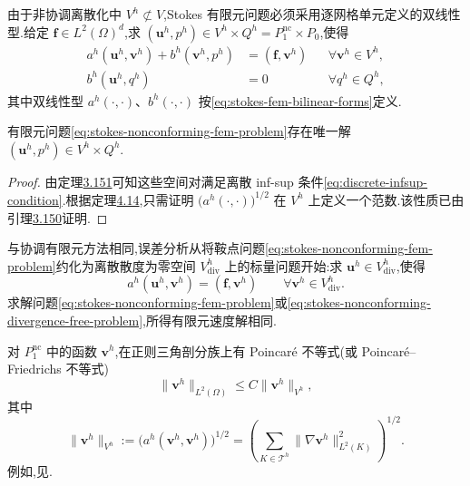 \begin{note}[有限元问题]\label{note:stokes-nonconforming-fem-problem}
由于非协调离散化中 $V^h\not\subset V$,Stokes 有限元问题必须采用逐网格单元定义的双线性型.给定 $\bm{f}\in L^2(\Omega)^d$,求 $(\bm{u}^h,p^h)\in V^h\times Q^h=P_1^{\mathrm{nc}}\times P_0$,使得
\begin{equation}\label{eq:stokes-nonconforming-fem-problem}
\begin{aligned}
  a^h(\bm{u}^h,\bm{v}^h)+b^h(\bm{v}^h,p^h)
  &=(\bm{f},\bm{v}^h)
  &&\forall\bm{v}^h\in V^h,\\
  b^h(\bm{u}^h,q^h)&=0
  &&\forall q^h\in Q^h,
\end{aligned}
\end{equation}
其中双线性型 $a^h(\cdot,\cdot)$、$b^h(\cdot,\cdot)$ 按\cref{eq:stokes-fem-bilinear-forms}定义.
\end{note}

\begin{corollary}[有限元问题的唯一可解性]\label{cor:stokes-nonconforming-unique-solvability}
有限元问题\cref{eq:stokes-nonconforming-fem-problem}存在唯一解 $(\bm{u}^h,p^h)\in V^h\times Q^h$.
\end{corollary}
\begin{proof}
由定理\hyperref[thm:crouzeix-raviart-infsup]{3.151}可知这些空间对满足离散 inf-sup 条件\cref{eq:discrete-infsup-condition}.根据定理\hyperref[thm:stokes-fem-existence]{4.14},只需证明 $\bigl(a^h(\cdot,\cdot)\bigr)^{1/2}$ 在 $V^h$ 上定义一个范数.该性质已由引理\hyperref[lem:nonconforming-energy-norm]{3.150}证明.
\end{proof}

\begin{note}[约化到离散散度为零函数空间]\label{note:stokes-nonconforming-divergence-free-reduction}
与协调有限元方法相同,误差分析从将鞍点问题\cref{eq:stokes-nonconforming-fem-problem}约化为离散散度为零空间 $V_{\mathrm{div}}^h$ 上的标量问题开始:求 $\bm{u}^h\in V_{\mathrm{div}}^h$,使得
\begin{equation}\label{eq:stokes-nonconforming-divergence-free-problem}
  a^h(\bm{u}^h,\bm{v}^h)
  =(\bm{f},\bm{v}^h)
  \qquad\forall\bm{v}^h\in V_{\mathrm{div}}^h.
\end{equation}
求解问题\cref{eq:stokes-nonconforming-fem-problem}或\cref{eq:stokes-nonconforming-divergence-free-problem},所得有限元速度解相同.
\end{note}

\begin{note}\label{note:stokes-nonconforming-poincare}
对 $P_1^{\mathrm{nc}}$ 中的函数 $\bm{v}^h$,在正则三角剖分族上有 Poincaré 不等式(或 Poincaré--Friedrichs 不等式)
\begin{equation}\label{eq:stokes-nonconforming-poincare}
  \|\bm{v}^h\|_{L^2(\Omega)}
  \leq C\|\bm{v}^h\|_{V^h},
\end{equation}
其中
\[
  \|\bm{v}^h\|_{V^h}
  :=\bigl(a^h(\bm{v}^h,\bm{v}^h)\bigr)^{1/2}
  =\left(\sum_{K\in\mathcal{T}^h}
       \|\nabla\bm{v}^h\|_{L^2(K)}^2\right)^{1/2}.
\]
例如,见\textcite{Knobloch2001,Brenner2003}.
\end{note}

